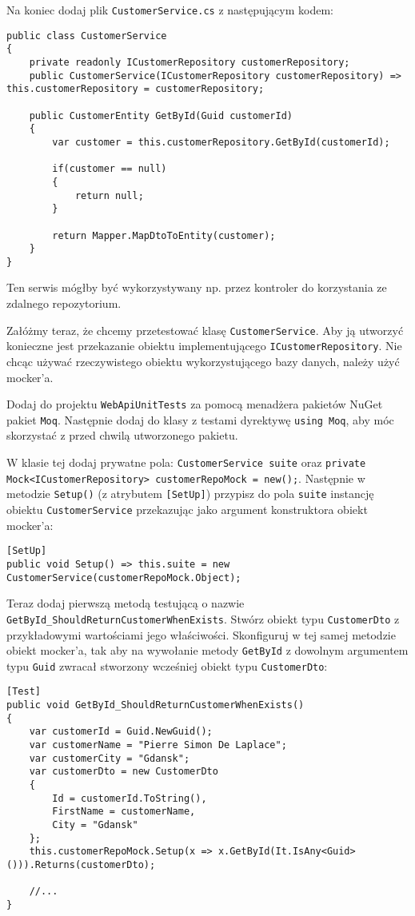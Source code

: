 Na koniec dodaj plik \texttt{CustomerService.cs} z następującym kodem:
\begin{lstlisting}
public class CustomerService
{
	private readonly ICustomerRepository customerRepository;
	public CustomerService(ICustomerRepository customerRepository) => this.customerRepository = customerRepository;
	
	public CustomerEntity GetById(Guid customerId)
	{
		var customer = this.customerRepository.GetById(customerId);
		
		if(customer == null)
		{
			return null;
		}
		
		return Mapper.MapDtoToEntity(customer);
	}
}
\end{lstlisting}
Ten serwis mógłby być wykorzystywany np. przez kontroler do korzystania ze zdalnego repozytorium. 

Załóżmy teraz, że chcemy przetestować klasę \texttt{CustomerService}. Aby ją utworzyć konieczne jest przekazanie obiektu implementującego \texttt{ICustomerRepository}. Nie chcąc używać rzeczywistego obiektu wykorzystującego bazy danych, należy użyć mocker'a.  

Dodaj do projektu \texttt{WebApiUnitTests} za pomocą menadżera pakietów NuGet pakiet \texttt{Moq}. Następnie dodaj do klasy z testami dyrektywę \texttt{using Moq}, aby móc skorzystać z przed chwilą utworzonego pakietu. 

W klasie tej dodaj prywatne pola: \texttt{CustomerService suite} oraz \texttt{private Mock<ICustomerRepository> customerRepoMock = new();}.  Następnie w metodzie \texttt{Setup()} (z atrybutem \texttt{[SetUp]}) przypisz do pola \texttt{suite} instancję obiektu \texttt{CustomerService} przekazując jako argument konstruktora obiekt mocker'a:
\begin{lstlisting}
[SetUp]
public void Setup() => this.suite = new CustomerService(customerRepoMock.Object);
\end{lstlisting}

Teraz dodaj pierwszą metodą testującą o nazwie \texttt{GetById\_ShouldReturnCustomerWhenExists}. Stwórz obiekt typu \texttt{CustomerDto} z przykładowymi wartościami jego właściwości. Skonfiguruj w tej samej metodzie obiekt mocker'a, tak aby na wywołanie metody \texttt{GetById} z dowolnym argumentem typu \texttt{Guid} zwracał stworzony wcześniej obiekt typu \texttt{CustomerDto}:
\begin{lstlisting}
[Test]
public void GetById_ShouldReturnCustomerWhenExists()
{
	var customerId = Guid.NewGuid();
	var customerName = "Pierre Simon De Laplace";
	var customerCity = "Gdansk";	
	var customerDto = new CustomerDto
	{
		Id = customerId.ToString(),
		FirstName = customerName,
		City = "Gdansk"
	};
	this.customerRepoMock.Setup(x => x.GetById(It.IsAny<Guid>())).Returns(customerDto);
	
	//...
}
\end{lstlisting}

